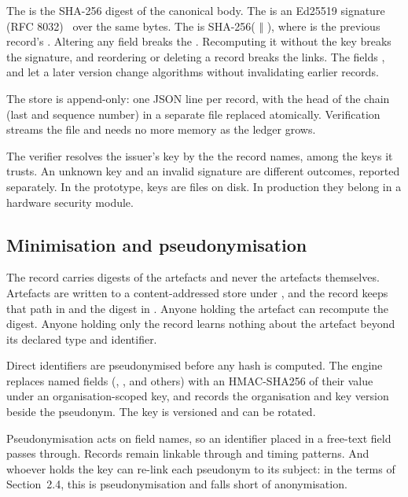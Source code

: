 The  is the SHA-256 digest of the canonical body. The  is an Ed25519 signature (RFC 8032)~\cite{rfc8032} over the same bytes. The  is SHA-256( $\Vert$ ), where  is the previous record's . Altering any field breaks the . Recomputing it without the key breaks the signature, and reordering or deleting a record breaks the links. The fields ,  and  let a later version change algorithms without invalidating earlier records.

The store is append-only: one JSON line per record, with the head of the chain (last  and sequence number) in a separate file replaced atomically. Verification streams the file and needs no more memory as the ledger grows.

The verifier resolves the issuer's key by the  the record names, among the keys it trusts. An unknown key and an invalid signature are different outcomes, reported separately. In the prototype, keys are files on disk. In production they belong in a hardware security module.

\subsection{Minimisation and pseudonymisation}

The record carries digests of the artefacts and never the artefacts themselves. Artefacts are written to a content-addressed store under , and the record keeps that path in  and the digest in . Anyone holding the artefact can recompute the digest. Anyone holding only the record learns nothing about the artefact beyond its declared type and identifier.

Direct identifiers are pseudonymised before any hash is computed. The engine replaces named fields (, ,  and others) with an HMAC-SHA256 of their value under an organisation-scoped key, and records the organisation and key version beside the pseudonym. The key is versioned and can be rotated.

Pseudonymisation acts on field names, so an identifier placed in a free-text field passes through. Records remain linkable through  and timing patterns. And whoever holds the key can re-link each pseudonym to its subject: in the terms of Section~2.4, this is pseudonymisation and falls short of anonymisation.

